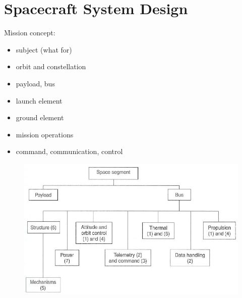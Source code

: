 \section{Spacecraft System Design}
\f{Mission concept:} 
\begin{itemize}
 \item subject (what for)
 \item orbit and constellation
 \item payload, bus
 \item launch element
 \item ground element
 \item mission operations
 \item command, communication, control
\end{itemize}
\begin{figure}[ht!]
 \centering
 \includegraphics[scale=0.6]{overview}
\end{figure}